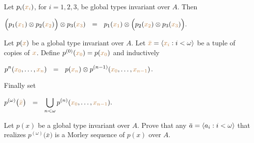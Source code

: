 \begin{fact}
  Let $p_i({\color{brown} x_i})$, for $i=1,2,3$, be global types invariant over $A$.
  Then

  \hfil$\Big(p_1({\color{brown} x_1})\otimes p_2({\color{brown} x_2})\Big)\otimes p_3({\color{brown} x_3})\ \ =\ \ p_1({\color{brown} x_1})\otimes \Big(p_2({\color{brown} x_2})\otimes p_3({\color{brown} x_3})\Big).$

\end{fact}

Let $p({\color{brown} x})$ be a global type invariant over $A$.
Let ${\color{brown} \bar x}=\langle{\color{brown}x_i}:i<\omega\rangle$ be a tuple of copies of ${\color{brown} x}$.
Define $p^{(0)}({\color{brown} x_0})=p({\color{brown} x_0})$ and inductively\smallskip

\hfil$\displaystyle p^{n}({\color{brown} x_0},\dots,{\color{brown} x_n})\ \ =\ \ p({\color{brown} x_n})\otimes p^{(n-1)}({\color{brown} x_0},\dots,{\color{brown} x_{n-1}})$.

Finally set 

\hfil$\displaystyle p^{(\omega)}\big({\color{brown} \bar x}\big)\ \ =\ \ \bigcup_{n<\omega}p^{(n)}({\color{brown} x_0},\dots,{\color{brown} x_{n-1}}).$

\begin{exercise}

\end{exercise}


\begin{exercise}
  Let $p(x)$ be a global type invariant over $A$.
  Prove that any $\bar a=\langle a_i:i<\omega\rangle$ that realizes $p^{(\omega)}\big(\bar x\big)$ is a Morley sequence of $p(x)$ over $A$. 
\end{exercise}






